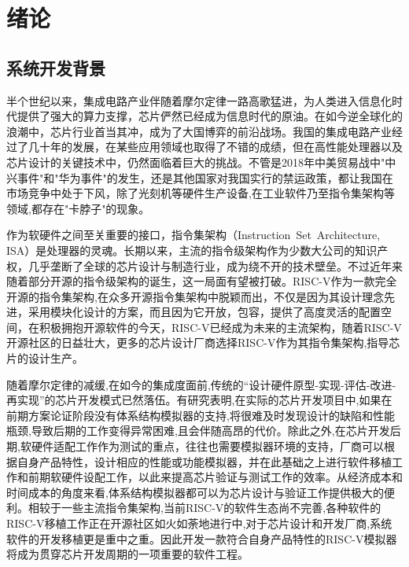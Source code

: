 
\chapter{绪论}

\section{系统开发背景}
半个世纪以来，集成电路产业伴随着摩尔定律一路高歌猛进，为人类进入信息化时代提供了强大的算力支撑，芯片俨然已经成为信息时代的原油。在如今逆全球化的浪潮中，芯片行业首当其冲，成为了大国博弈的前沿战场。我国的集成电路产业经过了几十年的发展，在某些应用领域也取得了不错的成绩，但在高性能处理器以及芯片设计的关键技术中，仍然面临着巨大的挑战\cite{huzhenbo,huzhenbo1}。不管是2018年中美贸易战中"中兴事件"和"华为事件"的发生，还是其他国家对我国实行的禁运政策，都让我国在市场竞争中处于下风，除了光刻机等硬件生产设备,在工业软件乃至指令集架构等领域,都存在"卡脖子"的现象。


作为软硬件之间至关重要的接口，指令集架构（Instruction Set Architecture, ISA）是处理器的灵魂。长期以来，主流的指令级架构作为少数大公司的知识产权，几乎垄断了全球的芯片设计与制造行业，成为绕不开的技术壁垒。不过近年来随着部分开源的指令级架构的诞生，这一局面有望被打破。RISC-V作为一款完全开源的指令集架构,在众多开源指令集架构中脱颖而出，不仅是因为其设计理念先进，采用模块化设计的方案，而且因为它开放，包容，提供了高度灵活的配置空间，在积极拥抱开源软件的今天，RISC-V已经成为未来的主流架构，随着RISC-V开源社区的日益壮大，更多的芯片设计厂商选择RISC-V作为其指令集架构,指导芯片的设计生产\cite{包云岗2022开源芯片生态技术体系构建面临的机遇与挑战}。

随着摩尔定律的减缓,在如今的集成度面前,传统的“设计硬件原型-实现-评估-改进-再实现”的芯片开发模式已然落伍\cite{jichengdu}。有研究表明,在实际的芯片开发项目中,如果在前期方案论证阶段没有体系结构模拟器的支持,将很难及时发现设计的缺陷和性能瓶颈,导致后期的工作变得异常困难,且会伴随高昂的代价\cite{buzhou}。除此之外,在芯片开发后期,软硬件适配工作作为测试的重点，往往也需要模拟器环境的支持\cite{黄聪会2012软件移植理论与技术研究,butko2012accuracy}，厂商可以根据自身产品特性，设计相应的性能或功能模拟器，并在此基础之上进行软件移植工作和前期软硬件设配工作，以此来提高芯片验证与测试工作的效率。从经济成本和时间成本的角度来看,体系结构模拟器都可以为芯片设计与验证工作提供极大的便利。相较于一些主流指令集架构,当前RISC-V的软件生态尚不完善,各种软件的RISC-V移植工作正在开源社区如火如荼地进行中,对于芯片设计和开发厂商,系统软件的开发移植更是重中之重。因此开发一款符合自身产品特性的RISC-V模拟器将成为贯穿芯片开发周期的一项重要的软件工程。


